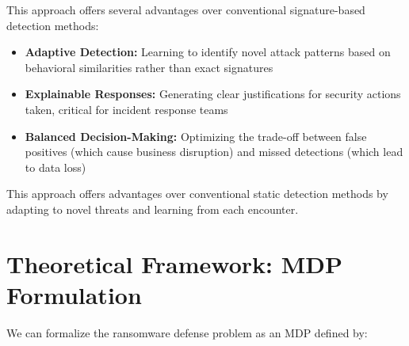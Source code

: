 \documentclass[11pt]{article}
\begin{document}
This approach offers several advantages over conventional signature-based detection methods:
\begin{itemize}
    \item \textbf{Adaptive Detection:} Learning to identify novel attack patterns based on behavioral similarities rather than exact signatures
    \item \textbf{Explainable Responses:} Generating clear justifications for security actions taken, critical for incident response teams
    \item \textbf{Balanced Decision-Making:} Optimizing the trade-off between false positives (which cause business disruption) and missed detections (which lead to data loss)
\end{itemize}

This approach offers advantages over conventional static detection methods by adapting to novel threats and learning from each encounter.

\section*{Theoretical Framework: MDP Formulation}

We can formalize the ransomware defense problem as an MDP defined by:
\end{document}
